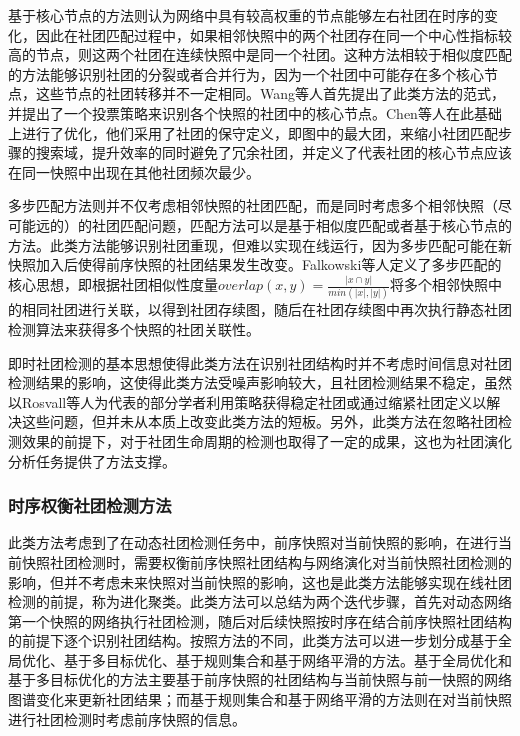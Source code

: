 基于核心节点的方法则认为网络中具有较高权重的节点能够左右社团在时序的变化，因此在社团匹配过程中，如果相邻快照中的两个社团存在同一个中心性指标较高的节点，则这两个社团在连续快照中是同一个社团。这种方法相较于相似度匹配的方法能够识别社团的分裂或者合并行为，因为一个社团中可能存在多个核心节点，这些节点的社团转移并不一定相同。Wang等人\cite{wang2008commtracker}首先提出了此类方法的范式，并提出了一个投票策略来识别各个快照的社团中的核心节点。Chen等人\cite{chen2010detecting}在此基础上进行了优化，他们采用了社团的保守定义，即图中的最大团，来缩小社团匹配步骤的搜索域，提升效率的同时避免了冗余社团，并定义了代表社团的核心节点应该在同一快照中出现在其他社团频次最少。

多步匹配方法则并不仅考虑相邻快照的社团匹配，而是同时考虑多个相邻快照（尽可能远的）的社团匹配问题，匹配方法可以是基于相似度匹配或者基于核心节点的方法。此类方法能够识别社团重现，但难以实现在线运行，因为多步匹配可能在新快照加入后使得前序快照的社团结果发生改变。Falkowski等人\cite{falkowski2006mining,falkowski2007data}定义了多步匹配的核心思想，即根据社团相似性度量$overlap(x,y)=\frac{\lvert x \cap y \rvert}{min(\lvert x \rvert,\lvert y \rvert)}$将多个相邻快照中的相同社团进行关联，以得到社团存续图，随后在社团存续图中再次执行静态社团检测算法来获得多个快照的社团关联性。

即时社团检测的基本思想使得此类方法在识别社团结构时并不考虑时间信息对社团检测结果的影响，这使得此类方法受噪声影响较大，且社团检测结果不稳定，虽然以Rosvall等人\cite{rosvall2010mapping}为代表的部分学者利用策略获得稳定社团或通过缩紧社团定义以解决这些问题，但并未从本质上改变此类方法的短板。另外，此类方法在忽略社团检测效果的前提下，对于社团生命周期的检测也取得了一定的成果\cite{chen2010detecting}，这也为社团演化分析任务提供了方法支撑。
\subsubsection{时序权衡社团检测方法}
此类方法考虑到了在动态社团检测任务中，前序快照对当前快照的影响，在进行当前快照社团检测时，需要权衡前序快照社团结构与网络演化对当前快照社团检测的影响，但并不考虑未来快照对当前快照的影响，这也是此类方法能够实现在线社团检测的前提，称为进化聚类。此类方法可以总结为两个迭代步骤，首先对动态网络第一个快照的网络执行社团检测，随后对后续快照按时序在结合前序快照社团结构的前提下逐个识别社团结构。按照方法的不同，此类方法可以进一步划分成基于全局优化、基于多目标优化、基于规则集合和基于网络平滑的方法。基于全局优化和基于多目标优化的方法主要基于前序快照的社团结构与当前快照与前一快照的网络图谱变化来更新社团结果；而基于规则集合和基于网络平滑的方法则在对当前快照进行社团检测时考虑前序快照的信息。

